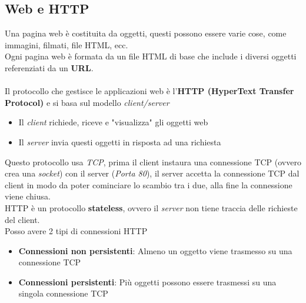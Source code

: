 \documentclass{article}
\begin{document}
        \subsection{Web e HTTP}
            Una pagina web è costituita da oggetti, questi possono essere varie cose, come immagini, filmati, file HTML, ecc.\\
            Ogni pagina web è formata da un file HTML di base che include i diversi oggetti referenziati da un \textbf{URL}.\\
            \\
            Il protocollo che gestisce le applicazioni web è l'\textbf{HTTP (HyperText Transfer Protocol)} e si basa sul modello \textit{client/server}
            \begin{itemize}
                \item Il \textit{client} richiede, riceve e "visualizza" gli oggetti web
                \item Il \textit{server} invia questi oggetti in risposta ad una richiesta
            \end{itemize}
            Questo protocollo usa \textit{TCP}, prima il client instaura una connessione TCP (ovvero crea una \textit{socket}) con il server (\textit{Porta 80}), il server accetta la connessione TCP dal client in modo da poter cominciare lo scambio tra i due, alla fine la connessione viene chiusa.\\
            HTTP è un protocollo \textbf{stateless}, ovvero il \textit{server} non tiene traccia delle richieste del client.\\
            Posso avere 2 tipi di connessioni HTTP
            \begin{itemize}
                \item \textbf{Connessioni non persistenti}: Almeno un oggetto viene trasmesso su una connessione TCP
                \item \textbf{Connessioni persistenti}: Più oggetti possono essere trasmessi su una singola connessione TCP
            \end{itemize} 
\end{document}
